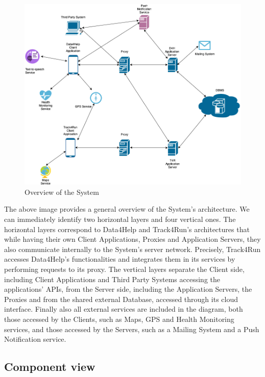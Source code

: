 \documentclass[titlepage]{article}
\begin{document}
\begin{figure}[H]
	\center
  	\includegraphics[width=15cm]{Overview.png}
  	\caption{Overview of the System}
 	\label{fig:OVERVIEW}
\end{figure}
The above image provides a general overview of the System’s architecture. We can immediately identify two horizontal layers and four vertical ones.
The horizontal layers correspond to Data4Help and Track4Run’s architectures that while having their own Client Applications, Proxies and Application Servers, they also communicate internally to the System’s server network. 
Precisely, Track4Run accesses Data4Help’s functionalities and integrates them in its services by performing requests to its proxy.
The vertical layers separate the Client side, including Client Applications and Third Party Systems accessing the applications’ APIs, from the Server side, including the Application Servers, the Proxies and from the shared external Database, accessed through its cloud interface.
Finally also all external services are included in the diagram, both those accessed by the Clients, such as Maps, GPS and Health Monitoring services, and those accessed by the Servers, such as a Mailing System and a Push Notification service.
\pagebreak

\subsection{Component view}
\end{document}
